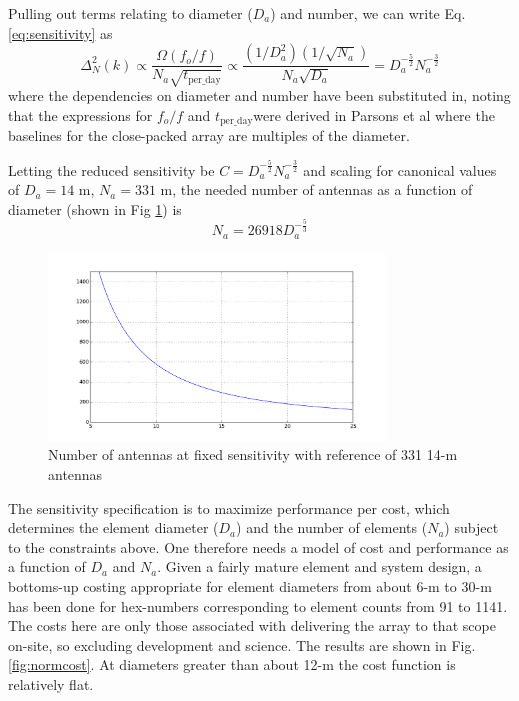\documentclass[11pt]{article}
\begin{document}
Pulling out terms relating to diameter ($D_a$) and number, we can write Eq. \ref{eq:sensitivity} as
\begin{equation}
\label{eq:reducedSensitivity}
\Delta^2_N(k) \propto \frac{\Omega (f_o/f)}{N_a\sqrt{t_\text{per\_day}}} \propto \frac{(1/D_a^2)(1/\sqrt{N_a})}{N_a\sqrt{D_a}}
= D_a^{-\frac{5}{2}}N_a^{-\frac{3}{2}}
\end{equation}
where the dependencies on diameter and number have been substituted in, noting that the expressions for $f_o/f$ and 
$t_\text{per\_day}$were derived in Parsons et al where the baselines for the close-packed array are multiples of the diameter.

Letting the reduced sensitivity be $C = D_a^{-\frac{5}{2}}N_a^{-\frac{3}{2}}$ and scaling for canonical values of $D_a = 14$ m, $N_a = 331$ m, the needed number of antennas as a function of diameter (shown in Fig \ref{fig:Nsens}) is
\begin{equation}
\label{eq:Nmetric}
N_a = 26918 D_a^{-\frac{5}{3}}
\end{equation}

\begin{figure}[h]
\centering
\includegraphics[width=0.8\textwidth]{Nsens.png}
\caption{Number of antennas at fixed sensitivity with reference of 331 14-m antennas}
\label{fig:Nsens}
\end{figure}

The sensitivity specification is to maximize performance per cost, which determines the element 
diameter ($D_a$) and the number of elements ($N_a$) subject to the constraints above.  One therefore 
needs a model of cost and performance as a function of $D_a$ and $N_a$.  Given a fairly mature element
and system design, a bottoms-up costing appropriate for element diameters from about 6-m to 30-m 
has been done for hex-numbers corresponding to element counts from 91 to 1141.  The costs here
are only those associated with delivering the array to that scope on-site, so excluding development and
science.  The results are shown in Fig. \ref{fig:normcost}.  At diameters greater than about 12-m the cost function
is relatively flat.
\end{document}
